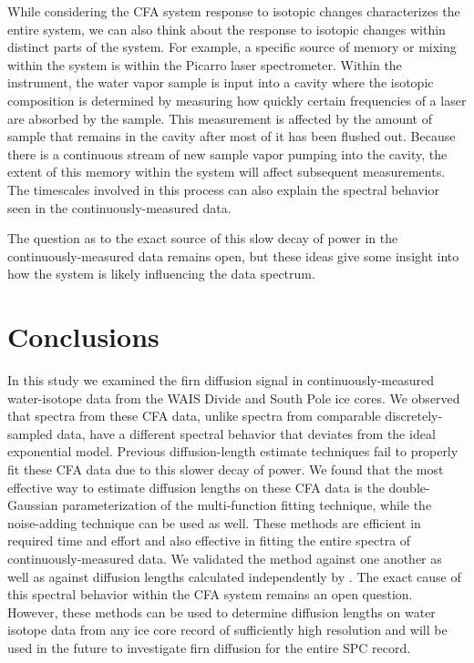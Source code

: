 \documentclass[draft, jgrga]{AGUTeX}
\begin{document}
\begin{article}
While considering the CFA system response to isotopic changes characterizes the entire system, we can also think about the response to isotopic changes within distinct parts of the system. For example, a specific source of memory or mixing within the system is within the Picarro laser spectrometer. Within the instrument, the water vapor sample is input into a cavity where the isotopic composition is determined by measuring how quickly certain frequencies of a laser are absorbed by the sample. This measurement is affected by the amount of sample that remains in the cavity after most of it has been flushed out. Because there is a continuous stream of new sample vapor pumping into the cavity, the extent of this memory within the system will affect subsequent measurements. The timescales involved in this process can also explain the spectral behavior seen in the continuously-measured data.

The question as to the exact source of this slow decay of power in the continuously-measured data remains open, but these ideas give some insight into how the system is likely influencing the data spectrum.


\section{Conclusions}

In this study we examined the firn diffusion signal in continuously-measured water-isotope data from the WAIS Divide and South Pole ice cores. We observed that spectra from these CFA data, unlike spectra from comparable discretely-sampled data, have a different spectral behavior that deviates from the ideal exponential model. Previous diffusion-length estimate techniques fail to properly fit these CFA data due to this slower decay of power. We found that the most effective way to estimate diffusion lengths on these CFA data is the double-Gaussian parameterization of the multi-function fitting technique, while the noise-adding technique can be used as well. These methods are efficient in required time and effort and also effective in fitting the entire spectra of continuously-measured data. We validated the method against one another as well as against diffusion lengths calculated independently by \citet{Jones2017a}. The exact cause of this spectral behavior within the CFA system remains an open question. However, these methods can be used to determine diffusion lengths on water isotope data from any ice core record of sufficiently high resolution and will be used in the future to investigate firn diffusion for the entire SPC record.


\end{article}
\end{document}
